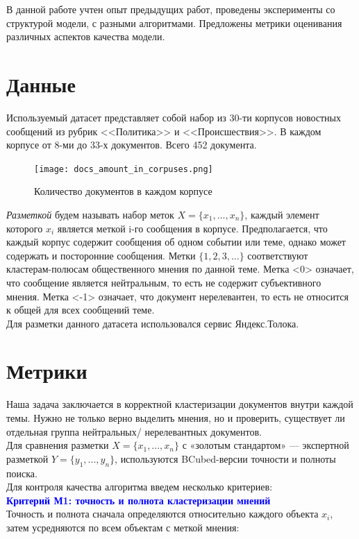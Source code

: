 \documentclass{article}
\begin{document}
В данной работе учтен опыт предыдущих работ, проведены эксперименты со структурой модели, с разными алгоритмами. Предложены метрики оценивания различных аспектов качества модели. 


\section{Данные}
Используемый датасет представляет собой набор из 30-ти корпусов новостных сообщений из рубрик <<Политика>> и <<Происшествия>>. В каждом корпусе от 8-ми до 33-х документов. Всего 452 документа.\\
\begin{figure}[!htb]
\center
    \texttt{[image: docs\_amount\_in\_corpuses.png]}
    \caption{Количество документов в каждом корпусе}
\end{figure}
\textit{Разметкой} будем называть набор меток $X=\{x_1,...,x_n\}$, каждый элемент которого $x_i$ является меткой i-го сообщения в корпусе. Предполагается, что каждый корпус содержит сообщения об одном событии или теме, однако может содержать и посторонние сообщения. Метки $\{1,2,3,...\}$ соответствуют кластерам-полюсам общественного мнения по данной теме. Метка <0> означает, что сообщение является нейтральным, то есть не содержит субъективного мнения. Метка <-1> означает, что документ нерелевантен, то есть не относится к общей для всех сообщений теме.\\

Для разметки данного датасета использовался сервис Яндекс.Толока.

\section{Метрики}
Наша задача заключается в корректной кластеризации документов внутри каждой темы. Нужно не только верно выделить мнения, но и проверить, существует ли отдельная группа нейтральных/ нерелевантных документов. \\
Для сравнения разметки $X=\{x_1,...,x_n\}$ с «золотым стандартом» — экспертной разметкой $Y=\{y_1,...,y_n\}$, используются BCubed-версии точности и полноты поиска.\\
Для контроля качества алгоритма введем несколько критериев:\\

\textbf{\textcolor{blue}{Критерий М1: точность и полнота кластеризации мнений}}\\
Точность и полнота сначала определяются относительно каждого объекта $x_i$, затем усредняются по всем объектам с меткой мнения:\\
\end{document}
